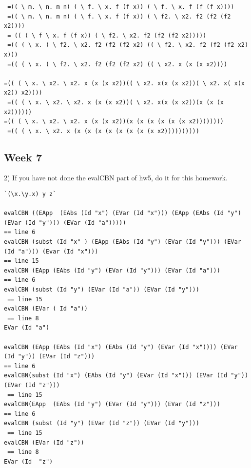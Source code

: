 \documentclass{article}
\theoremstyle{theorem}
\theoremstyle{definition}
\theoremstyle{remark}
\begin{document}
\begin{lstlisting}
 =(( \ m. \ n. m n) ( \ f. \ x. f (f x)) ( \ f. \ x. f (f (f x))))
 =(( \ m. \ n. m n) ( \ f. \ x. f (f x)) ( \ f2. \ x2. f2 (f2 (f2 x2))))
 = (( ( \ f \ x. f (f x)) ( \ f2. \ x2. f2 (f2 (f2 x2)))))
 =(( ( \ x. ( \ f2. \ x2. f2 (f2 (f2 x2) (( \ f2. \ x2. f2 (f2 (f2 x2) x)))
 =(( ( \ x. ( \ f2. \ x2. f2 (f2 (f2 x2) (( \ x2. x (x (x x2))))
 
=(( ( \ x. \ x2. \ x2. x (x (x x2))(( \ x2. x(x (x x2))( \ x2. x( x(x x2)) x2))))
 =(( ( \ x. \ x2. \ x2. x (x (x x2))( \ x2. x(x (x x2))(x (x (x x2))))))
=(( ( \ x. \ x2. \ x2. x (x (x x2))(x (x (x (x (x (x x2))))))))
 =(( ( \ x. \ x2. x (x (x (x (x (x (x (x (x x2))))))))))
\end{lstlisting}




\subsection{Week 7}


2) If you have not done the evalCBN part of hw5, do it for this homework.
\begin{lstlisting}
`(\x.\y.x) y z`

evalCBN ((EApp  (EAbs (Id "x") (EVar (Id "x"))) (EApp (EAbs (Id "y") (EVar (Id "y"))) (EVar (Id "a")))))
== line 6
evalCBN (subst (Id "x" ) (EApp (EAbs (Id "y") (EVar (Id "y"))) (EVar (Id "a"))) (Evar (Id "x"))) 
== line 15
evalCBN (EApp (EAbs (Id "y") (EVar (Id "y"))) (EVar (Id "a")))
== line 6
evalCBN (subst (Id "y") (EVar (Id "a")) (EVar (Id "y")))
 == line 15
evalCBN (EVar ( Id "a"))
 == line 8
EVar (Id "a")

evalCBN (EApp (EAbs (Id "x") (EAbs (Id "y") (EVar (Id "x")))) (EVar (Id "y")) (EVar (Id "z"))) 
== line 6
evalCBN(subst (Id "x") (EAbs (Id "y") (EVar (Id "x"))) (EVar (Id "y")) (EVar (Id "z")))
 == line 15
evalCBN(EApp  (EAbs (Id "y") (EVar (Id "y"))) (EVar (Id "z")))
== line 6
evalCBN (subst (Id "y") (EVar (Id "z")) (EVar (Id "y")))
 == line 15
evalCBN (EVar (Id "z")) 
 == line 8
EVar (Id  "z")
\end{lstlisting}
\end{document}
